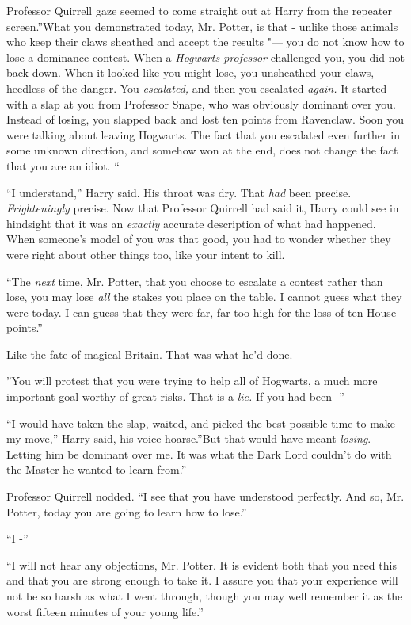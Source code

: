 Professor Quirrell gaze seemed to come straight out at Harry from the
repeater screen.''What you demonstrated today, Mr. Potter, is that -
unlike those animals who keep their claws sheathed and accept the
results "--- you do not know how to lose a dominance contest. When a
\emph{Hogwarts professor} challenged you, you did not back down. When it
looked like you might lose, you unsheathed your claws, heedless of the
danger. You \emph{escalated,} and then you escalated \emph{again.} It
started with a slap at you from Professor Snape, who was obviously
dominant over you. Instead of losing, you slapped back and lost ten
points from Ravenclaw. Soon you were talking about leaving Hogwarts. The
fact that you escalated even further in some unknown direction, and
somehow won at the end, does not change the fact that you are an idiot.
``

``I understand,'' Harry said. His throat was dry. That \emph{had} been
precise. \emph{Frighteningly} precise. Now that Professor Quirrell had
said it, Harry could see in hindsight that it was an \emph{exactly}
accurate description of what had happened. When someone's model of you
was that good, you had to wonder whether they were right about other
things too, like your intent to kill.

``The \emph{next} time, Mr. Potter, that you choose to escalate a contest
rather than lose, you may lose \emph{all} the stakes you place on the
table. I cannot guess what they were today. I can guess that they were
far, far too high for the loss of ten House points.''

Like the fate of magical Britain. That was what he'd done.

''You will protest that you were trying to help all of Hogwarts, a much
more important goal worthy of great risks. That is a \emph{lie.} If you
had been -''

``I would have taken the slap, waited, and picked the best possible time
to make my move,'' Harry said, his voice hoarse.''But that would have
meant \emph{losing}. Letting him be dominant over me. It was what the
Dark Lord couldn't do with the Master he wanted to learn from.''

Professor Quirrell nodded. ``I see that you have understood perfectly.
And so, Mr. Potter, today you are going to learn how to lose.''

``I -''

``I will not hear any objections, Mr. Potter. It is evident both that
you need this and that you are strong enough to take it. I assure you
that your experience will not be so harsh as what I went through, though
you may well remember it as the worst fifteen minutes of your young
life.''

